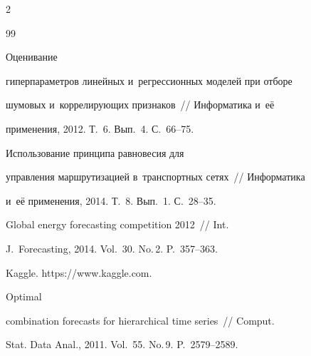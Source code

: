 \begin{multicols}{2}





{\small\frenchspacing

 {%


 \begin{thebibliography}{99}








 Оценивание

    гиперпараметров линейных и~регрессионных моделей при отборе

    шумовых и~коррелирующих признаков~// Информатика и~её

    применения, 2012. Т.~6. Вып.~4. С.~66--75.








 Использование принципа равновесия для

    управления маршрутизацией в~транспортных сетях~// Информатика

    и~её применения, 2014. Т.~8. Вып.~1. С.~28--35.








 Global energy forecasting competition 2012~// Int.

    J.~Forecasting, 2014. Vol.~30. No.\,2. P.~357--363.




    Kaggle. {\sf https://www.kaggle.com}.




 Optimal

    combination forecasts for hierarchical time series~// Comput.

    Stat. Data Anal., 2011. Vol.~55. No.\,9. P.~2579--2589.




\end{thebibliography}}}
\end{multicols}
